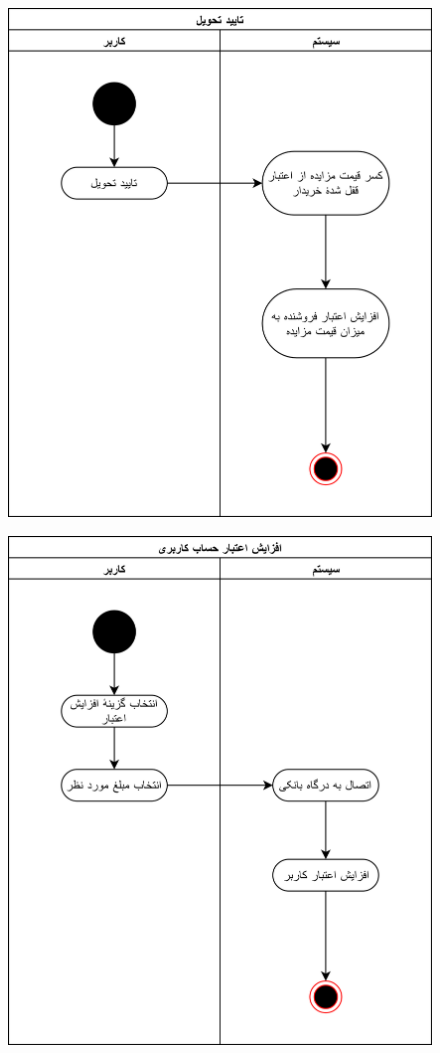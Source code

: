\documentclass{article}
\begin{document}
\begin{figure}[htp]
\includegraphics[width = 1\textwidth]{../Activity Diagrams/Activity 4.png}
\caption{}
\label{activity3}
\end{figure}

\begin{figure}[htp]
\includegraphics[width = 1\textwidth]{../Activity Diagrams/Activity 5.png}
\caption{}
\label{activity4}
\end{figure}
\end{document}
